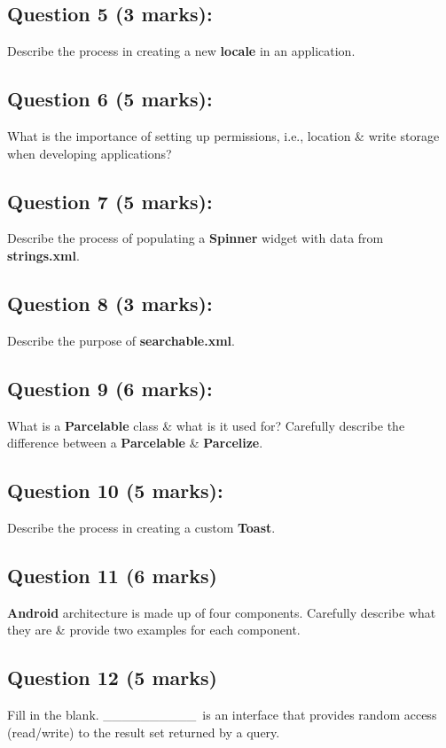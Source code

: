 \documentclass{article}
\begin{document}
\subsection*{Question 5 (3 marks):}
Describe the process in creating a new \textbf{locale} in an application.

\subsection*{Question 6 (5 marks):}
What is the importance of setting up permissions, i.e., location \& write storage when developing applications?

\subsection*{Question 7 (5 marks):}
Describe the process of populating a \textbf{Spinner} widget with data from \textbf{strings.xml}.

\subsection*{Question 8 (3 marks):}
Describe the purpose of \textbf{searchable.xml}.

\subsection*{Question 9 (6 marks):}
What is a \textbf{Parcelable} class \& what is it used for? Carefully describe the difference between a \textbf{Parcelable} \& \textbf{Parcelize}.

\subsection*{Question 10 (5 marks):}
Describe the process in creating a custom \textbf{Toast}.

\subsection*{Question 11 (6 marks)}
\textbf{Android} architecture is made up of four components. Carefully describe what they are \& provide two examples for each component.

\subsection*{Question 12 (5 marks)}
Fill in the blank. \_\_\_\_\_\_\_\_\_\_\ is an interface that provides random access (read/write) to the result set returned by a query.
\end{document}
